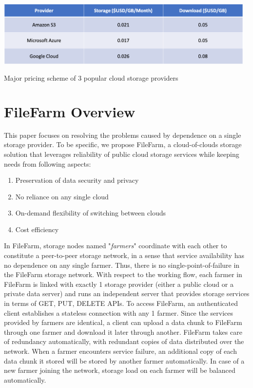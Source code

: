 \begin{table}[!b]
\centering
  \includegraphics[width=13cm]{tables/table_cloud_storage_cost.png}
  \caption{Major pricing scheme of 3 popular cloud storage providers}
  \label{table:cloudstoragecost}
\end{table}

\section{FileFarm Overview}
\label{s:filefarmoverview}
This paper focuses on resolving the problems caused by dependence on a single storage provider. To be specific, we propose FileFarm, a cloud-of-clouds storage solution that leverages reliability of public cloud storage services while keeping needs from following aspects:

\begin{enumerate}
    \item Preservation of data security and privacy
    \item No reliance on any single cloud
    \item On-demand flexibility of switching between clouds
    \item Cost efficiency
\end{enumerate}

In FileFarm, storage nodes named "\textit{farmers}" coordinate with each other to constitute a peer-to-peer storage network, in a sense that service availability has no dependence on any single farmer. Thus, there is no single-point-of-failure in the FileFarm storage network. With respect to the working flow, each farmer in FileFarm is linked with exactly 1 storage provider (either a public cloud or a private data server) and runs an independent server that provides storage services in terms of GET, PUT, DELETE APIs. To access FileFarm, an authenticated client establishes a stateless connection with any 1 farmer. Since the services provided by farmers are identical, a client can upload a data chunk to FileFarm through one farmer and download it later through another. FileFarm takes care of redundancy automatically, with redundant copies of data distributed over the network. When a farmer encounters service failure, an additional copy of each data chunk it stored will be stored by another farmer automatically. In case of a new farmer joining the network, storage load on each farmer will be balanced automatically.

